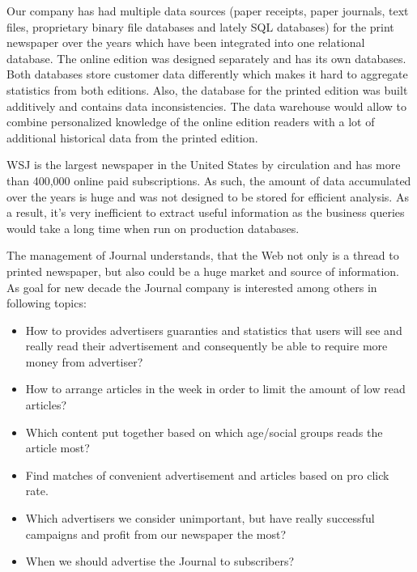 Our company has had multiple data sources (paper receipts, paper journals, text files, proprietary binary file databases and lately SQL databases) for the print newspaper over the years which have been integrated into one relational database. The online edition was designed separately and has its own databases. Both databases store customer data differently which makes it hard to aggregate statistics from both editions. Also, the database for the printed edition was built additively and contains data inconsistencies. The data warehouse would allow to combine personalized knowledge of the online edition readers with a lot of additional historical data from the printed edition.


WSJ is the largest newspaper in the United States by circulation and has more than 400,000 online paid subscriptions. As such, the amount of data accumulated over the years is huge and was not designed to be stored for efficient analysis. As a result, it’s very inefficient to extract useful information as the business queries would take a long time when run on production databases.

The management of Journal understands, that the Web not only is a thread to printed newspaper, but also could be a huge market and source of information. As goal for new decade the Journal company is interested among others in following topics:
\begin{itemize}
    \item How to provides advertisers guaranties and statistics that users will see and really read their advertisement and consequently be able to require more money from advertiser?
    \item How to arrange articles in the week in order to limit the amount of low read articles?
    \item Which content put together based on which age/social groups reads the article most?
    \item Find matches of convenient advertisement and articles based on pro click rate.
    \item Which advertisers we consider unimportant, but have really successful campaigns and profit from our newspaper the most?
    \item When we should advertise the Journal to subscribers?
\end{itemize}



